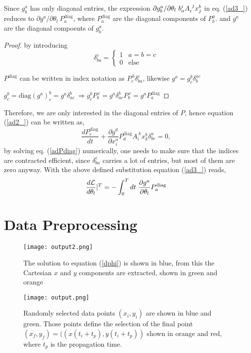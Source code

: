 \documentclass[12pt,a4paper]{article}
\begin{document}
Since $g^a_b$ has only diagonal entries, the expression ${\partial g^a_b}/{\partial \theta_l} \  b^i_a A_i^{\ j} x^b_j$ in eq. (\ref{ad3_}) reduces to ${\partial g^a}/{\partial \theta_l} \ P^{\text{diag} }_a$, where $P^{\text{diag} }_a$ are the diagonal components of $P^a_b$. and $g^a$ are the diagonal compoents of $g^a_b$. 
\begin{proof}
	by introducing 
	\[ \delta_{ba}^c = \begin{cases} 
		1 & a=b=c \\
		0 & \textrm{else}
	\end{cases}
	\]
	
	$P^{\text{diag} }$ can be written in index notation as  $P^{\ b}_c \delta_{ba}^c$, likewise $g^a = g^b_c \delta_{b}^{ac}$ 
	
	$g^b_c = \text{diag}(g^a)^b_c = g^a \delta^b_{ac} \ \Rightarrow g^b_c P_b^{\ c} = g^a \delta^b_{ac} P_b^{\ c} = g^a P^{\text{diag} }_a$ 
	
\end{proof}


Therefore, we are only interested in the diagonal entries of $P$, hence equation (\ref{ad2_}) can be written as,
\begin{equation}
\label{adPdiag}
\frac{d P^{\text{diag} }_e}{dt} +  \frac{\partial g^d}{\partial x^a_i}P^{\text{diag} }_d A_i^{\ k} x^b_k \delta^a_{be}=0,
\end{equation}
by solving eq. (\ref{adPdiag}) numerically, one needs to make sure that the indices are contracted efficient, since  $\delta_{ba}^c$ carries a lot of entries, but most of them are zero anyway.
With the above defined substitution equation (\ref{ad3_}) reads,
\begin{equation}
\frac{d\Lcal}{d\theta_l}|^{T}  = - \int^T_0 dt\ \frac{\partial g^a}{\partial \theta_l} P^{\text{diag} }_a
\end{equation}

\section{Data Preprocessing}
\begin{figure}[h]
    \centering
    \texttt{[image: output2.png]}
    \caption{The solution to equation (\ref{dphi}) is shown in blue, from this the Cartesian $x$ and $y$ components are extracted,  shown in green and orange}
    \label{fig:fig1}
\end{figure}

\begin{figure}[h]
    \centering
    \texttt{[image: output.png]}
    \caption{Randomly selected data points $(x_i, y_i)$ are shown in blue and green. Those points define the selection of the final point $(x_f, y_f)=((x(t_i+t_p), y(t_i+t_p))$ shown in orange and red, where $t_p$ is the propagation time.}
    \label{fig:fig2}
\end{figure}
\end{document}
